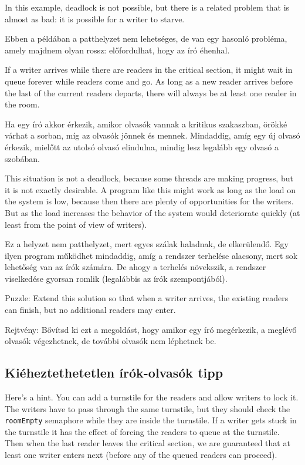 \documentclass{book}
\newcommand{\clearemptydoublepage}{\newpage\cleardoublepage}
\begin{document}
In this example, deadlock is not possible, but there is a related
problem that is almost as bad: it is possible for a writer to
starve.

Ebben a példában a patthelyzet nem lehetséges, de van egy hasonló probléma,
amely majdnem olyan rossz: előfordulhat, hogy az író éhenhal.

If a writer arrives while there are readers in the critical section,
it might wait in queue forever while readers come and go.  As long
as a new reader arrives before the last of the current readers
departs, there will always be at least one reader in the room.

Ha egy író akkor érkezik, amikor olvasók vannak a kritikus szakaszban, örökké
várhat a sorban, míg az olvasók jönnek és mennek. Mindaddig, amíg egy új
olvasó érkezik, mielőtt az utolsó olvasó elindulna, mindig lesz legalább
egy olvasó a szobában.

This situation is not a deadlock, because some threads are making
progress, but it is not exactly desirable.  A program like this
might work as long as the load on the system is low, because then there
are plenty of opportunities for the writers.  But as the load
increases the behavior of the system would deteriorate quickly
(at least from the point of view of writers).

Ez a helyzet nem patthelyzet, mert egyes szálak haladnak, de elkerülendő.
Egy ilyen program működhet mindaddig, amíg a rendszer terhelése alacsony,
mert sok lehetőség van az írók számára. De ahogy a terhelés növekszik,
a rendszer viselkedése gyorsan romlik (legalábbis az írók szempontjából).

Puzzle: Extend this solution so that when a writer arrives,
the existing readers can finish, but no additional readers
may enter.

Rejtvény: Bővítsd ki ezt a megoldást, hogy amikor egy író megérkezik,
a meglévő olvasók végezhetnek, de további olvasók nem léphetnek be.

\clearemptydoublepage
\subsection{Kiéheztethetetlen írók-olvasók tipp}  

Here's a hint.  You can add a turnstile for the readers and
allow writers to lock it.  The writers have to pass through
the same turnstile, but they should check the {\tt roomEmpty}
semaphore while they are inside the turnstile.  If a writer
gets stuck in the turnstile it has the effect of forcing the
readers to queue at the turnstile.  Then when the last reader
leaves the critical section, we are guaranteed that at least
one writer enters next (before any of the queued readers can
proceed).
\end{document}
